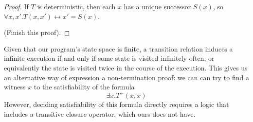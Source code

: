 \documentclass[preprint]{sigplanconf}
\theoremstyle{definition}
\begin{document}
\begin{proof}
 If $T$ is deterministic, then each $x$ has a unique successor $S(x)$, so $\forall x, x' . T(x, x') \leftrightarrow x' = S(x)$.
 
 (Finish this proof).
\end{proof}



Given that our program's state space is finite, a transition relation induces a infinite execution if and only if some state is 
visited infinitely often, or equivalently the state is visited twice in the course of the execution.
This gives us an alternative way of expression a non-termination proof: we can can try to find a witness $x$ to the satisfiability
of the formula
$$ \exists x . T^+(x, x)$$
However, deciding satisfiability of this formula directly requires a logic that includes a transitive closure operator, which
ours does not have.\\

\iffalse
\noindent {\bf Non-determinism.} A non-termination diagnosis procedure searching for a closed recurrence set under-approximates the transition relation, i.e. 
the closed recurrence set together with the under-approximation characterise non-termination \cite{DBLP:conf/tacas/ChenCFNO14}.
A potential difficulty with such a procedure lies in the handling of non-deterministic assignments. For illustration, consider the following loop:

\begin{lstlisting}[language=C]
while(x != 0) {
  y = nondet();
  x = x-y;
}
\end{lstlisting}

Only for certain values of $y$ the loop is non-terminating.
In order to restrict the values that may be assigned to $y$, we replace the non-deterministic choice with a fresh variable $a$ and use formula {\bf [CNT]}
to compute a closed recurrence set $N[a]$ parametrised by $a$. Now $N[a]$ becomes an assertion over $x \cup \{a\}$.
For this example, our technique computes $N[a](x,y,a) = ...$. \\%

\fi
\end{document}
